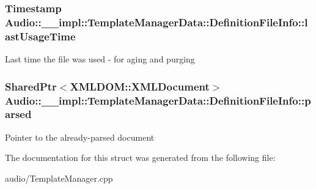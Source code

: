 \subsubsection[{\texorpdfstring{last\+Usage\+Time}{lastUsageTime}}]{\setlength{\rightskip}{0pt plus 5cm}Timestamp Audio\+::\+\_\+\+\_\+impl\+::\+Template\+Manager\+Data\+::\+Definition\+File\+Info\+::last\+Usage\+Time\hspace{0.3cm}{\ttfamily [mutable]}}\hypertarget{structAudio_1_1____impl_1_1TemplateManagerData_1_1DefinitionFileInfo_a160cef86b17ce9ef5c5fd5ead1f44f23}{}\label{structAudio_1_1____impl_1_1TemplateManagerData_1_1DefinitionFileInfo_a160cef86b17ce9ef5c5fd5ead1f44f23}
Last time the file was used -\/ for aging and purging 
\subsubsection[{\texorpdfstring{parsed}{parsed}}]{\setlength{\rightskip}{0pt plus 5cm}Shared\+Ptr$<${\bf X\+M\+L\+D\+O\+M\+::\+X\+M\+L\+Document}$>$ Audio\+::\+\_\+\+\_\+impl\+::\+Template\+Manager\+Data\+::\+Definition\+File\+Info\+::parsed}\hypertarget{structAudio_1_1____impl_1_1TemplateManagerData_1_1DefinitionFileInfo_a63d30a8c972c159479ba7cffafd0dd64}{}\label{structAudio_1_1____impl_1_1TemplateManagerData_1_1DefinitionFileInfo_a63d30a8c972c159479ba7cffafd0dd64}
Pointer to the already-\/parsed document 

The documentation for this struct was generated from the following file\+:\begin{DoxyCompactItemize}
\item 
audio/Template\+Manager.\+cpp\end{DoxyCompactItemize}

